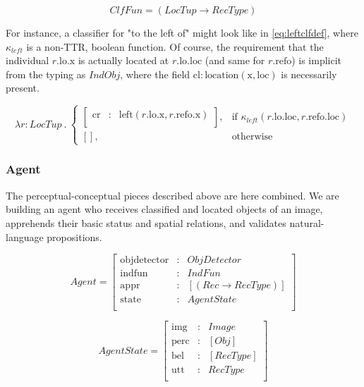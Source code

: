 \documentclass[11pt, a4paper]{article}
\begin{document}
\begin{equation}\label{eq:clf}
ClfFun = ( LocTup \rightarrow RecType )
\end{equation}

For instance, a classifier for "to the left of" might look like in \autoref{eq:leftclfdef}, where $\kappa_{left}$ is a non-TTR, boolean function.
Of course, the requirement that the individual $r.\text{lo}.\text{x}$ is actually located at $r.\text{lo}.\text{loc}$ (and same for $r.\text{refo}$) is implicit from the typing as $IndObj$, where the field $\text{cl} : \text{location}(\text{x}, \text{loc})$ is necessarily present.

\begin{equation}\label{eq:leftclfdef}
\lambda r : LocTup \ .\ 
\begin{cases}
\left[\begin{array}{rcl}
    \text{cr} &:& \text{left}(r.\text{lo}.\text{x}, r.\text{refo}.\text{x}) \\
\end{array}\right],
& \text{if } \kappa_{left}(r.\text{lo}.\text{loc}, r.\text{refo}.\text{loc}) \\
[], & \text{otherwise}
\end{cases}
\end{equation}



\subsubsection{Agent}

The perceptual-conceptual pieces described above are here combined.
We are building an agent who receives classified and located objects of an image, apprehends their basic status and spatial relations, and validates natural-language propositions.

\begin{equation}\label{eq:agent}
Agent = \left[\begin{array}{rcl}
    \text{objdetector} &:& ObjDetector \\
    \text{indfun} &:& IndFun \\
    \text{appr} &:& [(Rec \rightarrow RecType)] \\
    \text{state} &:& AgentState \\
    \end{array}\right]
\end{equation}

\begin{equation}\label{eq:state}
AgentState = \left[\begin{array}{rcl}
    \text{img} &:& Image \\
    \text{perc} &:& [Obj] \\
    \text{bel} &:& [RecType] \\
    \text{utt} &:& RecType \\
    \end{array}\right]
\end{equation}
\end{document}
